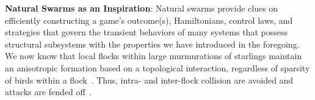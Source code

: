 \textbf{Natural Swarms as an Inspiration}: 
Natural swarms provide clues on efficiently constructing a game's outcome(s), Hamiltonians, control laws, and strategies that govern the transient behaviors of many systems that possess structural subsystems with the properties we have introduced in the foregoing. We now know that local flocks within large murmurations of starlings maintain an anisotropic formation based on a topological interaction, regardless of sparsity of birds within a flock~\cite{Cavagna2010Scale}. Thus, intra- and inter-flock collision are avoided and attacks are fended off~\cite{Ballerini1232}.
 



%

